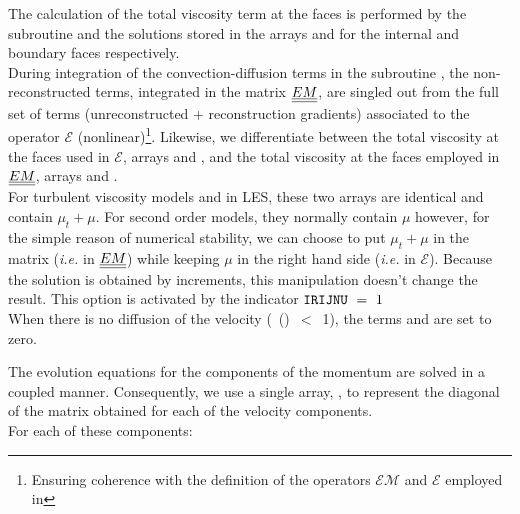 The calculation of the total viscosity term at the faces is performed by the subroutine  and the solutions stored in the arrays  and  for the internal and boundary faces respectively.\\
During integration of the convection-diffusion terms in the subroutine , the non-reconstructed terms, integrated in the matrix $\underline{\underline{EM}}$, are singled out from the full set of terms (unreconstructed +
reconstruction gradients) associated to the operator $\mathcal{E}$ (nonlinear)\footnote{ Ensuring coherence with the definition of the operators $\mathcal{EM}$ and $\mathcal{E}$ employed in  }.
Likewise, we differentiate between the total viscosity at the faces used in $\mathcal{E}$, arrays  and , and the total viscosity at the faces employed in $\underline{\underline{EM}}$, arrays  and .\\
For turbulent viscosity models and in LES, these two arrays are identical and contain $\mu_t+\mu$.
For second order models, they normally contain $\mu$ however, for the simple reason of numerical stability, we can choose to put $\mu_t+\mu$ in the matrix (\textit{i.e.} in $\underline{\underline{EM}}$) while keeping $\mu$ in the right hand side (\textit{i.e.} in $\mathcal{E}$). Because the solution is obtained by increments, this manipulation doesn't change the result. This option is activated by the indicator $\text{\texttt{IRIJNU}}\ =\ 1$\\
When there is no diffusion of the velocity (\ ()\ $<$\ 1), the terms  and  are set to zero.
\linebreak

The evolution equations for the components of the momentum are solved in a coupled manner. Consequently, we use a single array, , to represent the diagonal of the matrix obtained for each of the velocity components.\\
For each of these components:\\

